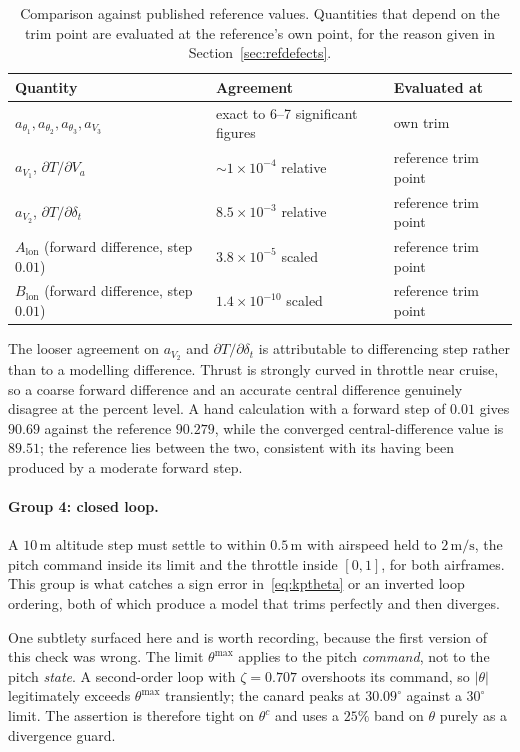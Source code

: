 \documentclass[11pt,a4paper]{article}
\newcommand{\lon}{\mathrm{lon}}
\newcommand{\dt}{\delta_t}
\begin{document}
\begin{table}[htbp]
\centering
\begin{tabular}{lll}
\toprule
Quantity & Agreement & Evaluated at \\
\midrule
$a_{\theta_1}, a_{\theta_2}, a_{\theta_3}, a_{V_3}$
  & exact to 6--7 significant figures & own trim \\
$a_{V_1}$, $\partial T/\partial V_a$
  & $\sim\!1\times10^{-4}$ relative & reference trim point \\
$a_{V_2}$, $\partial T/\partial\dt$
  & $8.5\times10^{-3}$ relative & reference trim point \\
$A_\lon$ (forward difference, step $0.01$)
  & $3.8\times10^{-5}$ scaled & reference trim point \\
$B_\lon$ (forward difference, step $0.01$)
  & $1.4\times10^{-10}$ scaled & reference trim point \\
\bottomrule
\end{tabular}
\caption{Comparison against published reference values. Quantities that depend on
the trim point are evaluated at the reference's own point, for the reason given in
Section~\ref{sec:refdefects}.}
\label{tab:verif}
\end{table}

The looser agreement on $a_{V_2}$ and $\partial T/\partial\dt$ is attributable to
differencing step rather than to a modelling difference. Thrust is strongly curved
in throttle near cruise, so a coarse forward difference and an accurate central
difference genuinely disagree at the percent level. A hand calculation with a
forward step of $0.01$ gives $90.69$ against the reference $90.279$, while the
converged central-difference value is $89.51$; the reference lies between the two,
consistent with its having been produced by a moderate forward step.

\paragraph{Group 4: closed loop.}
A $10\,\mathrm{m}$ altitude step must settle to within $0.5\,\mathrm{m}$ with
airspeed held to $2\,\mathrm{m/s}$, the pitch command inside its limit and the
throttle inside $[0,1]$, for both airframes. This group is what catches a sign
error in~\eqref{eq:kptheta} or an inverted loop ordering, both of which produce a
model that trims perfectly and then diverges.

One subtlety surfaced here and is worth recording, because the first version of
this check was wrong. The limit $\theta^{\max}$ applies to the pitch
\emph{command}, not to the pitch \emph{state}. A second-order loop with
$\zeta=0.707$ overshoots its command, so $|\theta|$ legitimately exceeds
$\theta^{\max}$ transiently; the canard peaks at $30.09^\circ$ against a
$30^\circ$ limit. The assertion is therefore tight on $\theta^c$ and uses a
$25\%$ band on $\theta$ purely as a divergence guard.
\end{document}
